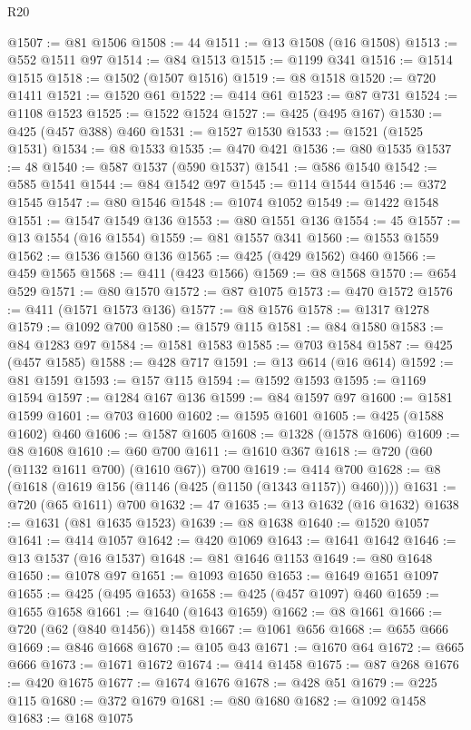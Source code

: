 \begin{lexlean}{R20}
\begin{coremodule}
@1507 := @81 @1506
@1508 := 44
@1511 := @13 @1508 (@16 @1508)
@1513 := @552 @1511 @97
@1514 := @84 @1513
@1515 := @1199 @341
@1516 := @1514 @1515
@1518 := @1502 (@1507 @1516)
@1519 := @8 @1518
@1520 := @720 @1411
@1521 := @1520 @61
@1522 := @414 @61
@1523 := @87 @731
@1524 := @1108 @1523
@1525 := @1522 @1524
@1527 := @425 (@495 @167)
@1530 := @425 (@457 @388) @460
@1531 := @1527 @1530
@1533 := @1521 (@1525 @1531)
@1534 := @8 @1533
@1535 := @470 @421
@1536 := @80 @1535
@1537 := 48
@1540 := @587 @1537 (@590 @1537)
@1541 := @586 @1540
@1542 := @585 @1541
@1544 := @84 @1542 @97
@1545 := @114 @1544
@1546 := @372 @1545
@1547 := @80 @1546
@1548 := @1074 @1052
@1549 := @1422 @1548
@1551 := @1547 @1549 @136
@1553 := @80 @1551 @136
@1554 := 45
@1557 := @13 @1554 (@16 @1554)
@1559 := @81 @1557 @341
@1560 := @1553 @1559
@1562 := @1536 @1560 @136
@1565 := @425 (@429 @1562) @460
@1566 := @459 @1565
@1568 := @411 (@423 @1566)
@1569 := @8 @1568
@1570 := @654 @529
@1571 := @80 @1570
@1572 := @87 @1075
@1573 := @470 @1572
@1576 := @411 (@1571 @1573 @136)
@1577 := @8 @1576
@1578 := @1317 @1278
@1579 := @1092 @700
@1580 := @1579 @115
@1581 := @84 @1580
@1583 := @84 @1283 @97
@1584 := @1581 @1583
@1585 := @703 @1584
@1587 := @425 (@457 @1585)
@1588 := @428 @717
@1591 := @13 @614 (@16 @614)
@1592 := @81 @1591
@1593 := @157 @115
@1594 := @1592 @1593
@1595 := @1169 @1594
@1597 := @1284 @167 @136
@1599 := @84 @1597 @97
@1600 := @1581 @1599
@1601 := @703 @1600
@1602 := @1595 @1601
@1605 := @425 (@1588 @1602) @460
@1606 := @1587 @1605
@1608 := @1328 (@1578 @1606)
@1609 := @8 @1608
@1610 := @60 @700
@1611 := @1610 @367
@1618 := @720 (@60 (@1132 @1611 @700) (@1610 @67)) @700
@1619 := @414 @700
@1628 := @8 (@1618 (@1619 @156 (@1146 (@425 (@1150 (@1343 @1157)) @460))))
@1631 := @720 (@65 @1611) @700
@1632 := 47
@1635 := @13 @1632 (@16 @1632)
@1638 := @1631 (@81 @1635 @1523)
@1639 := @8 @1638
@1640 := @1520 @1057
@1641 := @414 @1057
@1642 := @420 @1069
@1643 := @1641 @1642
@1646 := @13 @1537 (@16 @1537)
@1648 := @81 @1646 @1153
@1649 := @80 @1648
@1650 := @1078 @97
@1651 := @1093 @1650
@1653 := @1649 @1651 @1097
@1655 := @425 (@495 @1653)
@1658 := @425 (@457 @1097) @460
@1659 := @1655 @1658
@1661 := @1640 (@1643 @1659)
@1662 := @8 @1661
@1666 := @720 (@62 (@840 @1456)) @1458
@1667 := @1061 @656
@1668 := @655 @666
@1669 := @846 @1668
@1670 := @105 @43
@1671 := @1670 @64
@1672 := @665 @666
@1673 := @1671 @1672
@1674 := @414 @1458
@1675 := @87 @268
@1676 := @420 @1675
@1677 := @1674 @1676
@1678 := @428 @51
@1679 := @225 @115
@1680 := @372 @1679
@1681 := @80 @1680
@1682 := @1092 @1458
@1683 := @168 @1075

\end{coremodule}
\end{lexlean}
